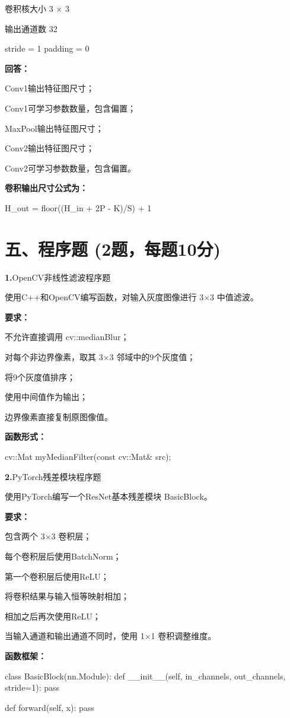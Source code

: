\documentclass[UTF8,openany,oneside,zihao=-4,fontset=windows]{ctexbook}
\newif\ifshowsolutions
\newcommand{\Question}[2]{%
  \par\Needspace{4\baselineskip}\medskip
  \noindent\textbf{\color{MVBlue}#1}\quad #2\par
}
\newcommand{\PracticeSpace}[1]{\ifshowsolutions\else\par\vspace{#1}\par\fi}
\begin{document}
\par 卷积核大小 3 × 3
\par 输出通道数 32
\begin{center}\small\ttfamily stride = 1 padding = 0\end{center}
\par\noindent\textbf{回答：}
\par\noindent\textbullet\quad Conv1输出特征图尺寸；
\par\noindent\textbullet\quad Conv1可学习参数数量，包含偏置；
\par\noindent\textbullet\quad MaxPool输出特征图尺寸；
\par\noindent\textbullet\quad Conv2输出特征图尺寸；
\par Conv2可学习参数数量，包含偏置。
\par\noindent\textbf{卷积输出尺寸公式为：}
\begin{center}\small\ttfamily H\_out = floor((H\_in + 2P - K)/S) + 1\end{center}
\PracticeSpace{4.2cm}
\section{五、程序题 (2题，每题10分)}
\Question{1.}{OpenCV非线性滤波程序题}
\par 使用C++和OpenCV编写函数，对输入灰度图像进行 3×3 中值滤波。
\par\noindent\textbf{要求：}
\par\noindent\textbullet\quad 不允许直接调用 cv::medianBlur；
\par\noindent\textbullet\quad 对每个非边界像素，取其 3×3 邻域中的9个灰度值；
\par\noindent\textbullet\quad 将9个灰度值排序；
\par\noindent\textbullet\quad 使用中间值作为输出；
\par 边界像素直接复制原图像值。
\par\noindent\textbf{函数形式：}
\begin{CodeBlock}
cv::Mat myMedianFilter(const cv::Mat& src);
\end{CodeBlock}
\PracticeSpace{5.5cm}
\Question{2.}{PyTorch残差模块程序题}
\par 使用PyTorch编写一个ResNet基本残差模块 BasicBlock。
\par\noindent\textbf{要求：}
\par\noindent\textbullet\quad 包含两个 3×3 卷积层；
\par\noindent\textbullet\quad 每个卷积层后使用BatchNorm；
\par\noindent\textbullet\quad 第一个卷积层后使用ReLU；
\par\noindent\textbullet\quad 将卷积结果与输入恒等映射相加；
\par\noindent\textbullet\quad 相加之后再次使用ReLU；
\par 当输入通道和输出通道不同时，使用 1×1 卷积调整维度。
\par\noindent\textbf{函数框架：}
\begin{CodeBlock}
class BasicBlock(nn.Module):
    def __init__(self, in_channels, out_channels, stride=1):
        pass

    def forward(self, x):
        pass
\end{CodeBlock}
\PracticeSpace{5.5cm}
\ifshowsolutions
\clearpage
\end{document}
